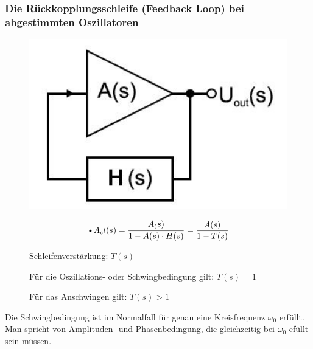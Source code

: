 \subsubsection{Die Rückkopplungsschleife (Feedback Loop) bei abgestimmten Oszillatoren}
\begin{figure}[h!]
	\begin{minipage}{0.3\textwidth} 
	  \includegraphics[width=1.0\textwidth]{images/Blockdiagramm_Oszillator}
	\end{minipage}
	\begin{minipage}{0.4\textwidth}
	  \begin{equation*}
        \text{\textbullet }A_cl(s) =\frac{A_(s)}{1-A(s) \cdot H(s)} = \frac{A(s)}{1-T(s)}
      \end{equation*}
      \begin{compactitem}
        \item Schleifenverstärkung: $T(s)$\\
        \item Für die Oszillations- oder Schwingbedingung gilt: $T(s)=1$\\
        \item Für das Anschwingen gilt: $T(s)>1$\\ 
      \end{compactitem}
	\end{minipage}
\end{figure}
\raggedright
Die Schwingbedingung ist im Normalfall für genau eine Kreisfrequenz $\omega _0$ erfüllt. Man       spricht von Amplituden- und Phasenbedingung, die gleichzeitig bei $\omega _0$ efüllt sein müssen.

